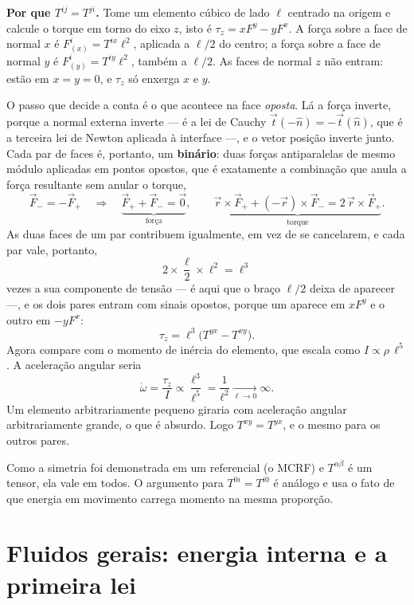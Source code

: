 \documentclass[12pt,a4paper,oneside]{book}
\theoremstyle{rgplain}
\theoremstyle{rgremark}
\begin{document}
\begin{resultado}
\textbf{Por que $T^{ij}=T^{ji}$.} Tome um elemento cúbico de lado $\ell$
centrado na origem e calcule o torque em torno do eixo $z$, isto é
$\tau_z=xF^y-yF^x$. A força sobre a face de normal $x$ é
$F^i_{(x)}=T^{ix}\ell^2$, aplicada a $\ell/2$ do centro; a força sobre a face
de normal $y$ é $F^i_{(y)}=T^{iy}\ell^2$, também a $\ell/2$. As faces de
normal $z$ não entram: estão em $x=y=0$, e $\tau_z$ só enxerga $x$ e $y$.

O passo que decide a conta é o que acontece na face \emph{oposta}. Lá a força
inverte, porque a normal externa inverte --- é a lei de Cauchy
$\vec t(-\hat n)=-\vec t(\hat n)$, que é a terceira lei de Newton aplicada à
interface ---, e o vetor posição inverte junto. Cada par de faces é, portanto,
um \textbf{binário}: duas forças antiparalelas de mesmo módulo aplicadas em
pontos opostos, que é exatamente a combinação que anula a força resultante sem
anular o torque,
\[
  \vec F_-=-\vec F_+
  \quad\Longrightarrow\quad
  \underbrace{\vec F_++\vec F_-=\vec 0}_{\text{força}},
  \qquad
  \underbrace{\vec r\times\vec F_++(-\vec r)\times\vec F_-
   =2\,\vec r\times\vec F_+}_{\text{torque}} .
\]
As duas faces de um par contribuem igualmente, em vez de se cancelarem, e cada
par vale, portanto,
\[
  2\times\frac{\ell}{2}\times\ell^2=\ell^3
\]
vezes a sua componente de tensão --- é aqui que o braço $\ell/2$ deixa de
aparecer ---, e os dois pares entram com sinais opostos, porque um aparece em
$xF^y$ e o outro em $-yF^x$:
\[
  \tau_z=\ell^3\bigl(T^{yx}-T^{xy}\bigr) .
\]
Agora compare com o momento de inércia do elemento, que escala como
$I\propto\rho\,\ell^5$. A aceleração angular seria
\[
  \dot\omega=\frac{\tau_z}{I}\propto\frac{\ell^3}{\ell^5}
  =\frac{1}{\ell^2}\xrightarrow[\ell\to0]{}\infty .
\]
Um elemento arbitrariamente pequeno giraria com aceleração angular
arbitrariamente grande, o que é absurdo. Logo $T^{xy}=T^{yx}$, e o mesmo para
os outros pares.
\end{resultado}

Como a simetria foi demonstrada em um referencial (o MCRF) e
$T^{\alpha\beta}$ é um tensor, ela vale em todos. O argumento para
$T^{0i}=T^{i0}$ é análogo e usa o fato de que energia em movimento carrega
momento na mesma proporção.

\section{Fluidos gerais: energia interna e a primeira lei}
\label{sec:energia-interna}
\end{document}
